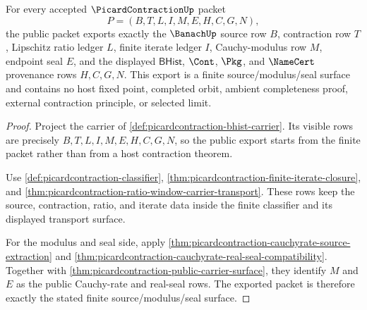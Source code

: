 \begin{theorem}
\label{thm:picardcontraction-public-banach-source-modulus-seal}
For every accepted $\PicardContractionUp$ packet
$$
P=(B,T,L,I,M,E,H,C,G,N),
$$
the public packet exports exactly the $\BanachUp$ source row $B$, contraction
row $T$, Lipschitz ratio ledger $L$, finite iterate ledger $I$,
Cauchy-modulus row $M$, endpoint seal $E$, and the displayed $\mathsf{BHist}$,
$\Cont$, $\Pkg$, and $\NameCert$ provenance rows $H,C,G,N$. This export is a
finite source/modulus/seal surface and contains no host fixed point, completed
orbit, ambient completeness proof, external contraction principle, or selected
limit.
\end{theorem}
\begin{proof}
Project the carrier of \autoref{def:picardcontraction-bhist-carrier}. Its
visible rows are precisely $B,T,L,I,M,E,H,C,G,N$, so the public export starts
from the finite packet rather than from a host contraction theorem.

Use \autoref{def:picardcontraction-classifier},
\autoref{thm:picardcontraction-finite-iterate-closure}, and
\autoref{thm:picardcontraction-ratio-window-carrier-transport}. These rows keep
the source, contraction, ratio, and iterate data inside the finite classifier
and its displayed transport surface.

For the modulus and seal side, apply
\autoref{thm:picardcontraction-cauchyrate-source-extraction} and
\autoref{thm:picardcontraction-cauchyrate-real-seal-compatibility}. Together
with \autoref{thm:picardcontraction-public-carrier-surface}, they identify
$M$ and $E$ as the public Cauchy-rate and real-seal rows. The exported packet is
therefore exactly the stated finite source/modulus/seal surface.
\end{proof}

